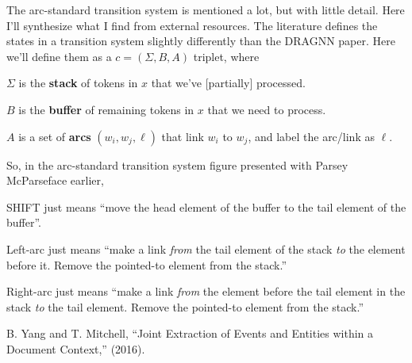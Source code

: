 \documentclass[11pt]{article}
\begin{document}
The arc-standard transition system is mentioned a lot, but with little detail. Here I'll synthesize what I find from external resources. The literature defines the states in a transition system slightly differently than the DRAGNN paper. Here we'll define them as a  $c = (\Sigma, B, A)$ triplet, where
\begin{compactitem}
	\item $\Sigma$ is the \textbf{stack} of tokens in $x$ that we've [partially] processed.
	\item $B$ is the \textbf{buffer} of remaining tokens in $x$ that we need to process. 
	\item $A$ is a set of \textbf{arcs} $(w_i, w_j, \ell)$ that link $w_i$ to $w_j$, and label the arc/link as $\ell$. 
\end{compactitem}
So, in the arc-standard transition system figure presented with Parsey McParseface earlier, 
\begin{compactitem}
	\item SHIFT just means ``move the head element of the buffer to the tail element of the buffer''. 
	
	\item Left-arc just means ``make a link \textit{from} the tail element of the stack \textit{to} the element before it. Remove the pointed-to element from the stack.''
	
	\item Right-arc just means ``make a link \textit{from} the element before the tail element in the stack \textit{to} the tail element. Remove the pointed-to element from the stack.''
\end{compactitem}





\vspace{-1em}
{\footnotesize B. Yang and T. Mitchell, ``Joint Extraction of Events and Entities within a Document Context,'' (2016).}
\end{document}

